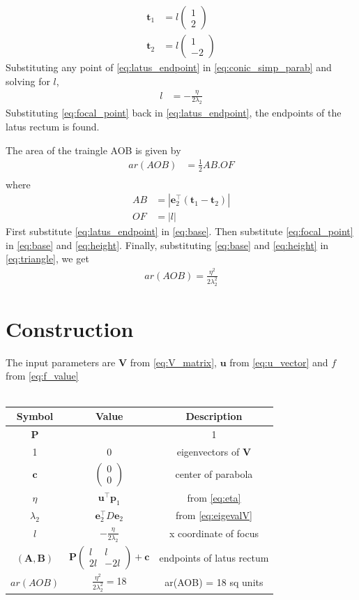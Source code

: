 \documentclass[journal,10pt,twocolumn]{article}
\providecommand{\abs}[1]{\left\vert#1\right\vert}
\let\vec\mathbf
\newcommand{\myvec}[1]{\ensuremath{\begin{pmatrix}#1\end{pmatrix}}}
\begin{document}
\begin{equation}
\begin{aligned}
	\vec{t}_1 &= l\myvec{1 \\ 2}\\
	\vec{t}_2 &= l\myvec{1 \\ -2}
\end{aligned}
	\label{eq:latus_endpoint}
\end{equation}
Substituting any point of \eqref{eq:latus_endpoint} in \eqref{eq:conic_simp_parab} and solving for $l$,
\begin{align}
	l &= -\frac{\eta}{2\lambda_2}
	\label{eq:focal_point}
\end{align}
Substituting \eqref{eq:focal_point} back in \eqref{eq:latus_endpoint}, the endpoints of the latus rectum is found.

The area of the traingle AOB is given by
\begin{align}
	ar(AOB) &= \frac{1}{2}AB.OF\\
	\label{eq:triangle}
\end{align}
where
\begin{align}
	\label{eq:base}
	AB &= \abs{\vec{e}_2^{\top}(\vec{t}_1-\vec{t}_2)}\\
	\label{eq:height}
	OF &= \abs{l}
\end{align}
First substitute \eqref{eq:latus_endpoint} in \eqref{eq:base}. Then substitute \eqref{eq:focal_point} in \eqref{eq:base} and \eqref{eq:height}. Finally, substituting \eqref{eq:base} and \eqref{eq:height} in \eqref{eq:triangle}, we get
\begin{align}
	ar(AOB) = \frac{\eta^2}{2\lambda_2^2}
\end{align}

\section*{\large Construction}
The input parameters are $\vec{V}$ from \eqref{eq:V_matrix}, $\vec{u}$ from \eqref{eq:u_vector} and $f$ from \eqref{eq:f_value}\\\\
{
\setlength\extrarowheight{5pt}
\begin{tabular}{|c|c|c|}
	\hline
	\textbf{Symbol}&\textbf{Value}&\textbf{Description}\\
	\hline
	$\vec{P}$&\myvec{0&1\\1&0}&eigenvectors of $\vec{V}$\\[5pt]
	\hline
	$\vec{c}$&$\myvec{0\\0}$&center of parabola\\
	\hline
	$\eta$&$\vec{u}^{\top}\vec{p}_1$&from \eqref{eq:eta}\\[5pt]
	\hline
	$\lambda_2$&$\vec{e}_2^{\top}D\vec{e}_2$&from \eqref{eq:eigevalV}\\[5pt]
	\hline
	$l$&$-\frac{\eta}{2\lambda_2}$&x coordinate of focus\\[5pt]
	\hline
	$(\vec{A},\vec{B})$&$\vec{P}\myvec{l&l\\2l&-2l} + \vec{c}$&endpoints of latus rectum\\[5pt]
	\hline
	$ar(AOB)$&$\frac{\eta^2}{2\lambda_2^2} = $18&ar(AOB) = 18 sq units\\[5pt]
	\hline
\end{tabular}
}
\end{document}
